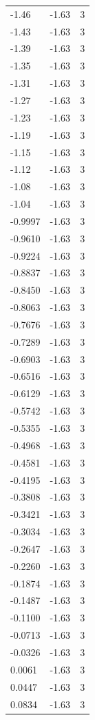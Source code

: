 \begin{longtable}{lrr}
  -1.46 & -1.63 & 3 \\
  -1.43 & -1.63 & 3 \\
  -1.39 & -1.63 & 3 \\
  -1.35 & -1.63 & 3 \\
  -1.31 & -1.63 & 3 \\
  -1.27 & -1.63 & 3 \\
  -1.23 & -1.63 & 3 \\
  -1.19 & -1.63 & 3 \\
  -1.15 & -1.63 & 3 \\
  -1.12 & -1.63 & 3 \\
  -1.08 & -1.63 & 3 \\
  -1.04 & -1.63 & 3 \\
  -0.9997 & -1.63 & 3 \\
  -0.9610 & -1.63 & 3 \\
  -0.9224 & -1.63 & 3 \\
  -0.8837 & -1.63 & 3 \\
  -0.8450 & -1.63 & 3 \\
  -0.8063 & -1.63 & 3 \\
  -0.7676 & -1.63 & 3 \\
  -0.7289 & -1.63 & 3 \\
  -0.6903 & -1.63 & 3 \\
  -0.6516 & -1.63 & 3 \\
  -0.6129 & -1.63 & 3 \\
  -0.5742 & -1.63 & 3 \\
  -0.5355 & -1.63 & 3 \\
  -0.4968 & -1.63 & 3 \\
  -0.4581 & -1.63 & 3 \\
  -0.4195 & -1.63 & 3 \\
  -0.3808 & -1.63 & 3 \\
  -0.3421 & -1.63 & 3 \\
  -0.3034 & -1.63 & 3 \\
  -0.2647 & -1.63 & 3 \\
  -0.2260 & -1.63 & 3 \\
  -0.1874 & -1.63 & 3 \\
  -0.1487 & -1.63 & 3 \\
  -0.1100 & -1.63 & 3 \\
  -0.0713 & -1.63 & 3 \\
  -0.0326 & -1.63 & 3 \\
  0.0061 & -1.63 & 3 \\
  0.0447 & -1.63 & 3 \\
  0.0834 & -1.63 & 3 \\

\end{longtable}
